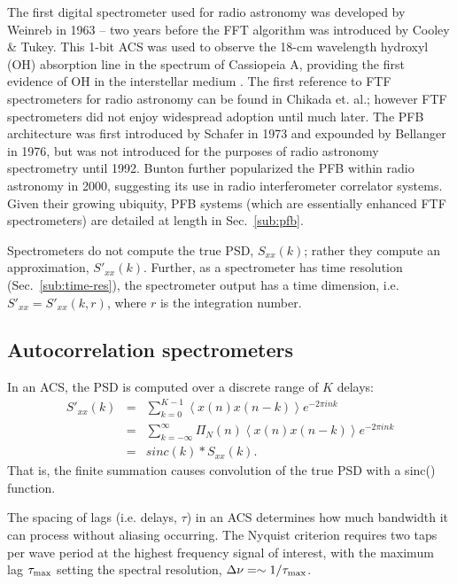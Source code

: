 \documentclass{ws-rv961x669}
\begin{document}
The first digital spectrometer used for radio astronomy was developed by Weinreb\citet{Weinreb:1963p10042} in 1963 -- two years before the FFT algorithm was introduced by Cooley \& Tukey\cite{Cooley1965}. This 1-bit ACS was used to observe the 18-cm wavelength hydroxyl (OH) absorption line in the spectrum of Cassiopeia A, providing the first evidence of OH in the interstellar medium \citep{Weinreb:1963p9992}. The first reference to FTF spectrometers for radio astronomy can be found in Chikada et. al.\citet{Chikada:1987p10044}; however FTF spectrometers did not enjoy widespread adoption until much later. The PFB architecture was first introduced by Schafer\cite{Schafer1973} in 1973 and expounded by Bellanger\cite{Bellanger:1976p7898} in 1976, but was not introduced for the purposes of radio astronomy spectrometry until 1992\cite{Duluk1992}. Bunton\cite{Bunton2000} further popularized the PFB within radio astronomy in 2000, suggesting its use in radio interferometer correlator systems. Given their growing ubiquity, PFB systems (which are essentially enhanced FTF spectrometers) are detailed at length in Sec.~\ref{sub:pfb}.

Spectrometers do not compute the true PSD, $S_{xx}(k)$; rather they compute an approximation, $S'_{xx}(k)$. Further, as a spectrometer has time resolution (Sec.~\ref{sub:time-res}), the spectrometer output has a time dimension, i.e. $S'_{xx} = S'_{xx}(k, r)$, where $r$ is the integration number. 

\subsection{Autocorrelation spectrometers}\label{sub:acs}

In an ACS, the PSD is computed over a discrete range of $K$ delays:
\begin{eqnarray}
S'_{xx}(k) & = & \sum_{k=0}^{K-1}\left\langle x(n)x(n-k)\right\rangle e^{-2\pi ink} \\
          & = &  \sum_{k=-\infty}^{\infty}\Pi_N(n)\left\langle x(n)x(n-k)\right\rangle e^{-2\pi ink} \\
          & = &  sinc(k) * S_{xx}(k).\label{eq:acs_sinc}
\end{eqnarray}
That is, the finite summation causes convolution of the true PSD with a sinc() function. 

The spacing of lags (i.e. delays, $\tau$) in an ACS determines how much bandwidth it can process without aliasing occurring. The Nyquist criterion requires two taps per wave period at the highest frequency signal of interest, with the maximum lag $\tau_{\rm{max}}$ setting the spectral resolution, $\Delta\nu = \sim 1 / \tau_{\rm{max}}$.
\end{document}
